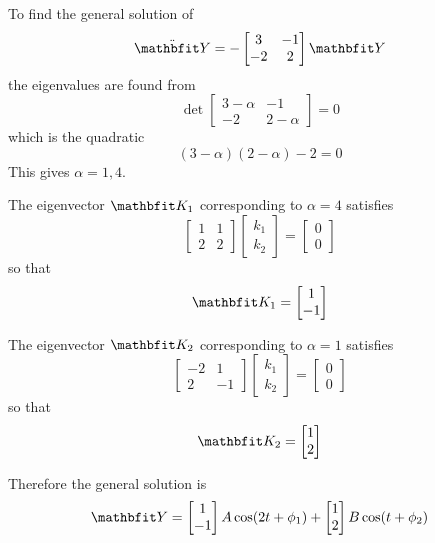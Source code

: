 \begin{example}
To find the general solution of
$$\ddot{\vect{Y}}=-\begin{bmatrix}3&-1\\-2&2\end{bmatrix}\vect{Y}$$
the eigenvalues are found from
$$\det\begin{bmatrix}3-\alpha&-1\\-2&2-\alpha\end{bmatrix}=0$$
which is the quadratic
$$(3-\alpha)(2-\alpha)-2=0$$
This gives $\alpha=1,4$.

The eigenvector $\vect{K}_1$ corresponding to $\alpha=4$ satisfies
$$\begin{bmatrix}1&1\\2&2\end{bmatrix}
\begin{bmatrix}k_1\\k_2\end{bmatrix}=\begin{bmatrix}0\\0\end{bmatrix}$$
so that
$$\vect{K}_1=\begin{bmatrix}1\\-1\end{bmatrix}$$

The eigenvector $\vect{K}_2$ corresponding to $\alpha=1$ satisfies
$$\begin{bmatrix}-2&1\\2&-1\end{bmatrix}
\begin{bmatrix}k_1\\k_2\end{bmatrix}=\begin{bmatrix}0\\0\end{bmatrix}$$
so that
$$\vect{K}_2=\begin{bmatrix}1\\2\end{bmatrix}$$

Therefore the general solution is
$$\vect{Y}=\begin{bmatrix}1\\-1\end{bmatrix}A\cos(2t+\phi_1)
+\begin{bmatrix}1\\2\end{bmatrix}B\cos(t+\phi_2)$$
\end{example}

